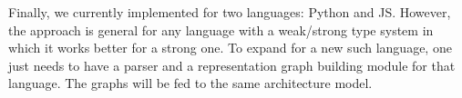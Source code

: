 Finally, we currently implemented {\tool} for two languages: Python
and JS. However, the approach is general for any language with a
weak/strong type system in which it works better for a strong one. To
expand for a new such language, one just needs to have a parser and a
representation graph building module for that language. The graphs
will be fed to the same architecture model.

